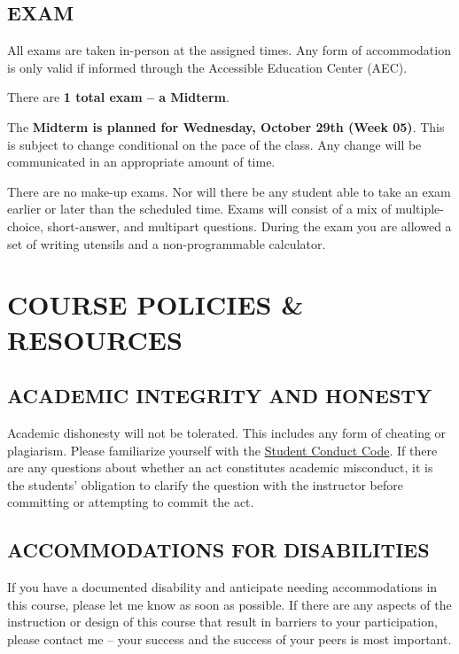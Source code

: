 \documentclass[11pt]{article}
\begin{document}
\subsection*{EXAM}
All exams are taken in-person at the assigned times. 
Any form of accommodation is only valid if informed through the Accessible Education Center (AEC).

There are \textbf{1 total exam -- a Midterm}. 

The \textbf{Midterm is planned for Wednesday, October 29th (Week 05)}. 
This is subject to change conditional on the pace of the class.
Any change will be communicated in an appropriate amount of time. 

There are no make-up exams. 
Nor will there be any student able to take an exam earlier or later than the scheduled time. 
Exams will consist of a mix of multiple-choice, short-answer, and multipart questions. 
During the exam you are allowed a set of writing utensils and a non-programmable calculator. 

\bigskip \bigskip 

\section*{COURSE POLICIES \& RESOURCES}

\subsection*{ACADEMIC INTEGRITY AND HONESTY}
Academic dishonesty will not be tolerated.
This includes any form of cheating or plagiarism.
Please familiarize yourself with the \href{https://policies.uoregon.edu/vol-3-administration-student-affairs/ch-1-conduct/student-conduct-code}{Student Conduct Code}.
If there are any questions about whether an act constitutes academic misconduct, it is the students' obligation to clarify the question with the instructor before committing or attempting to commit the act.

\subsection*{ACCOMMODATIONS FOR DISABILITIES}
If you have a documented disability and anticipate needing accommodations in this course, please let me know as soon as possible.
If there are any aspects of the instruction or design of this course that result in barriers to your participation, please contact me -- your success and the success of your peers is most important. 
\end{document}
